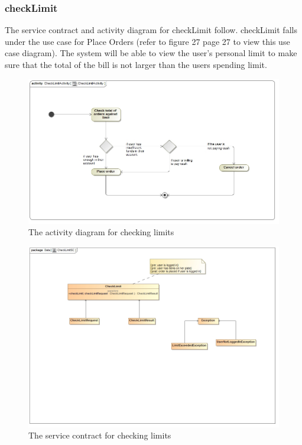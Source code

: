 \documentclass[a4paper,12pt]{report}
\begin{document}
\subsubsection{checkLimit}
The service contract and activity diagram for checkLimit follow. checkLimit falls under the use case for Place Orders (refer to figure 27 page 27 to view this use case diagram). The system will be able to view the user's personal limit to make sure that the total of the bill is not larger than the users spending limit. 
\begin{figure}[H]
  \centering
    \includegraphics[width=1.0\textwidth]{../images/CheckLimitActivity.jpg}
    \caption{The activity diagram for checking limits} 
\end{figure}

\begin{figure}[H]
	\centering
	\includegraphics[width=1.0\textwidth]{../images/CheckLimitSC.jpg}
	\caption{The service contract for checking limits}
\end{figure}
\end{document}
